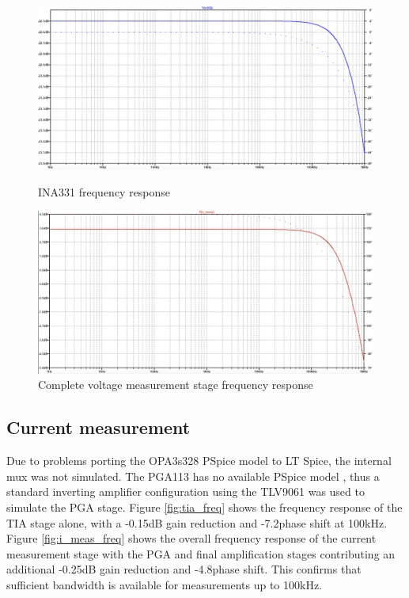 \begin{figure}[H]
    \centering
    \begin{minipage}{0.48\textwidth}
        \centering
        \includegraphics[width=\textwidth]{INA331FreqResponse.png}
        \caption{INA331 frequency response}
        \label{fig:ina_freq}
    \end{minipage}\hfill
    \begin{minipage}{0.48\textwidth}
        \centering
        \includegraphics[width=\textwidth]{VmeasFreqResponse.png}
        \caption{Complete voltage measurement stage frequency response}
        \label{fig:v_meas_freq}
    \end{minipage}
\end{figure}

\subsection{Current measurement}
Due to problems porting the OPA3s328 PSpice model to LT Spice, the internal mux was not simulated. The PGA113 has no available PSpice model \cite{PGA113PspiceModel2022}, thus a standard inverting amplifier configuration using the TLV9061 was used to simulate the PGA stage. Figure \ref{fig:tia_freq} shows the frequency response of the TIA stage alone, with a -0.15dB gain reduction and -7.2\textdegree phase shift at 100kHz. Figure \ref{fig:i_meas_freq} shows the overall frequency response of the current measurement stage with the PGA and final amplification stages contributing an additional -0.25dB gain reduction and -4.8\textdegree phase shift. This confirms that sufficient bandwidth is available for measurements up to 100kHz.

